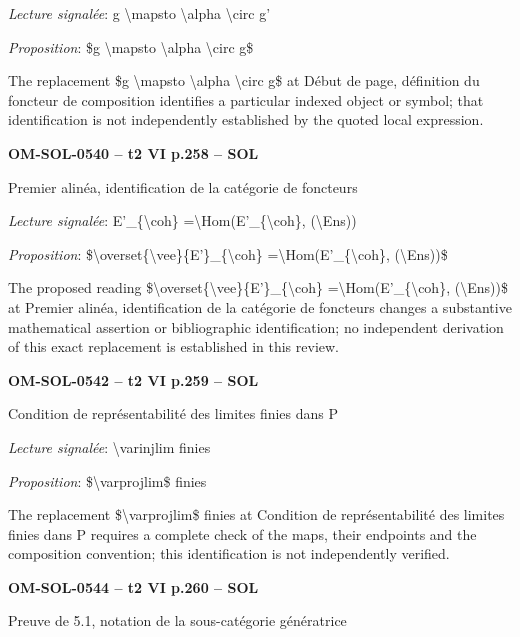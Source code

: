 \emph{Lecture signalée}: g \textbackslash{}mapsto \textbackslash{}alpha \textbackslash{}circ g'\par
\emph{Proposition}: \$g \textbackslash{}mapsto \textbackslash{}alpha \textbackslash{}circ g\$\par
The replacement \$g \textbackslash{}mapsto \textbackslash{}alpha \textbackslash{}circ g\$ at Début de page, définition du foncteur de composition identifies a particular indexed object or symbol; that identification is not independently established by the quoted local expression.\par
\par\noindent\textbf{OM-SOL-0540 -- t2 VI p.258 -- SOL}\par
Premier alinéa, identification de la catégorie de foncteurs\par
\emph{Lecture signalée}: E'\_\{\textbackslash{}coh\} =\allowbreak  \textbackslash{}Hom(E'\_\{\textbackslash{}coh\}, (\textbackslash{}Ens))\par
\emph{Proposition}: \$\textbackslash{}overset\{\textbackslash{}vee\}\{E'\}\_\{\textbackslash{}coh\} =\allowbreak  \textbackslash{}Hom(E'\_\{\textbackslash{}coh\}, (\textbackslash{}Ens))\$\par
The proposed reading \$\textbackslash{}overset\{\textbackslash{}vee\}\{E'\}\_\{\textbackslash{}coh\} =\allowbreak  \textbackslash{}Hom(E'\_\{\textbackslash{}coh\}, (\textbackslash{}Ens))\$ at Premier alinéa, identification de la catégorie de foncteurs changes a substantive mathematical assertion or bibliographic identification; no independent derivation of this exact replacement is established in this review.\par
\par\noindent\textbf{OM-SOL-0542 -- t2 VI p.259 -- SOL}\par
Condition de représentabilité des limites finies dans P\par
\emph{Lecture signalée}: \textbackslash{}varinjlim finies\par
\emph{Proposition}: \$\textbackslash{}varprojlim\$ finies\par
The replacement \$\textbackslash{}varprojlim\$ finies at Condition de représentabilité des limites finies dans P requires a complete check of the maps, their endpoints and the composition convention; this identification is not independently verified.\par
\par\noindent\textbf{OM-SOL-0544 -- t2 VI p.260 -- SOL}\par
Preuve de 5.1, notation de la sous-catégorie génératrice\par
